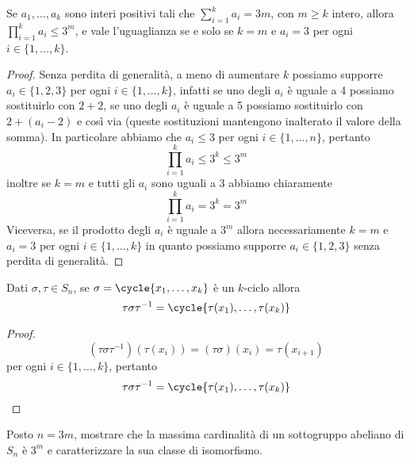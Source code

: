 \documentclass[11pt]{scrartcl}
\begin{document}
\begin{lemma}
    \label{lemma1.55}
    Se $a_1, \ldots, a_k$ sono interi positivi tali che $\displaystyle
    \sum_{i = 1}^k a_i = 3m$,
    con $m \geqslant k$ intero, allora $\displaystyle
        \prod_{i = 1}^k a_i \leq 3^m$, 
        e vale l'uguaglianza se e solo se $k = m$ e $a_i = 3$ per ogni $i \in \{1, \ldots, k\}$.
\end{lemma}

\begin{proof}
    Senza perdita di generalità, a meno di aumentare $k$ possiamo supporre
    $a_i \in \{1, 2, 3\}$ per ogni $i \in \{1, \ldots, k\}$, infatti se 
    uno degli $a_i$ è uguale a 4 possiamo sostituirlo con $2 + 2$, se uno degli
    $a_i$ è uguale a 5 possiamo sostituirlo con $2 + (a_i - 2)$ e così via
    (queste sostituzioni mantengono inalterato il valore della somma).
    In particolare abbiamo che $a_i \leqslant 3$ per ogni $i \in \{1, \ldots, n\}$,
    pertanto 
    \[
        \prod_{i = 1}^k a_i \leq 3^k \leq 3^m
    \]
    inoltre se $k = m$ e tutti gli $a_i$ sono uguali a 3 abbiamo chiaramente
    \[
        \prod_{i = 1}^k a_i = 3^k = 3^m
    \]
    Viceversa, se il prodotto degli $a_i$ è uguale a $3^m$ allora necessariamente
    $k = m$ e $a_i = 3$ per ogni $i \in \{1, \ldots, k\}$ in quanto possiamo
    supporre $a_i \in \{1, 2, 3\}$ senza perdita di generalità.
\end{proof}

\begin{lemma}
    \label{lemma1.56}
    Dati $\sigma, \tau \in S_n$, se $\sigma = \cycle{x_1, \ldots, x_k}$ è un 
    $k$-ciclo allora 
    \[
        \tau\sigma\tau^{-1} = \cycle{\tau(x_1),\ldots, \tau(x_k)}
    \]
\end{lemma}

\begin{proof}
    \[
        (\tau\sigma\tau^{-1})(\tau(x_i)) = (\tau\sigma)(x_i) = \tau(x_{i + 1})
    \]per ogni $i \in \{1, \ldots, k\}$, pertanto
    \[
        \tau\sigma\tau^{-1} = \cycle{\tau(x_1), \ldots, \tau(x_k)}
    \]
\end{proof}


\begin{exercise}
    Posto $n = 3m$, mostrare che la massima cardinalità di un sottogruppo
    abeliano di $S_n$ è $3^m$ e caratterizzare la sua classe di isomorfismo.
\end{exercise}
\end{document}
